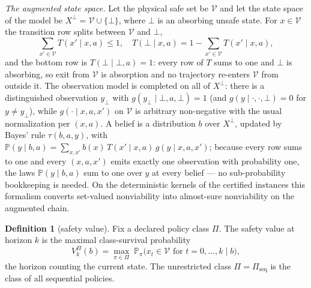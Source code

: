 \documentclass[10pt,twocolumn]{article}
\theoremstyle{plain}
\theoremstyle{definition}
\newtheorem{definition}[theorem]{Definition}
\theoremstyle{remark}
\begin{document}
\emph{The augmented state space.} Let the physical safe set be
\(\mathcal{V}\) and let the state space of the model be
\(X^{\perp} = \mathcal{V} \cup \{\bot\}\), where \(\bot\) is an absorbing
unsafe state. For \(x \in \mathcal{V}\) the transition row splits between
\(\mathcal{V}\) and \(\bot\),
\[
\textstyle\sum_{x' \in \mathcal{V}} T(x' \mid x, a) \le 1,\quad
T(\bot \mid x, a) = 1 - \sum_{x' \in \mathcal{V}} T(x' \mid x, a),
\]
and the bottom row is \(T(\bot \mid \bot, a) = 1\): every row of \(T\)
sums to one and \(\bot\) is absorbing, so exit from \(\mathcal{V}\) is
absorption and no trajectory re-enters \(\mathcal{V}\) from outside it.
The observation model is completed on all of \(X^{\perp}\): there is a
distinguished observation \(y_{\bot}\) with
\(g(y_{\bot} \mid \bot, a, \bot) = 1\) (and
\(g(y \mid \cdot, \cdot, \bot) = 0\) for \(y \ne y_{\bot}\)), while
\(g(\cdot \mid x, a, x')\) on \(\mathcal{V}\) is arbitrary non-negative
with the usual normalization per \((x, a)\). A belief is a distribution
\(b\) over \(X^{\perp}\), updated by Bayes' rule \(\tau(b, a, y)\), with
\(\mathbb{P}(y \mid b, a) = \sum_{x, x'} b(x)\, T(x' \mid x, a)\,
g(y \mid x, a, x')\); because every row sums to one and every
\((x, a, x')\) emits exactly one observation with probability one, the
laws \(\mathbb{P}(y \mid b, a)\) sum to one over \(y\) at every belief ---
no sub-probability bookkeeping is needed. On the deterministic kernels of
the certified instances this formalism converts set-valued nonviability into
almost-sure nonviability on the augmented chain.

\begin{definition}[safety value]\label{def:value}
Fix a declared policy class \(\Pi\). The safety value at horizon \(k\) is
the maximal class-survival probability
\[
V^{\Pi}_{k}(b) = \max_{\pi \in \Pi}\; \mathbb{P}_{\pi}\bigl( x_{t} \in
\mathcal{V} \text{ for } t = 0, \dots, k \;\big|\; b \bigr),
\]
the horizon counting the current state. The unrestricted class
\(\Pi = \Pi_{\mathrm{seq}}\) is the class of all sequential policies.
\end{definition}
\end{document}
